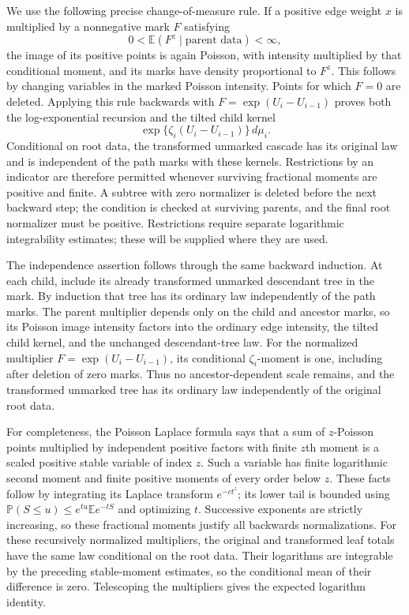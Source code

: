 \documentclass[11pt]{article}
\numberwithin{equation}{section}
\theoremstyle{definition}
\newcommand{\E}{\mathbb E}
\newcommand{\Pbb}{\mathbb P}
\begin{document}
We use the following precise change-of-measure rule. If a positive edge weight $x$ is multiplied by a nonnegative mark $F$ satisfying
\begin{equation}\label{eq:fracmoment}
0<\E(F^z\mid\text{parent data})<\infty,
\end{equation}
the image of its positive points is again Poisson, with intensity multiplied by that conditional moment, and its marks have density proportional to $F^z$. This follows by changing variables in the marked Poisson intensity. Points for which $F=0$ are deleted. Applying this rule backwards with $F=\exp(U_i-U_{i-1})$ proves both the log-exponential recursion and the tilted child kernel
\begin{equation}\label{eq:kernel}
\exp\{\zeta_i(U_i-U_{i-1})\}\,d\mu_i.
\end{equation}
Conditional on root data, the transformed unmarked cascade has its original law and is independent of the path marks with these kernels. Restrictions by an indicator are therefore permitted whenever surviving fractional moments are positive and finite. A subtree with zero normalizer is deleted before the next backward step; the condition is checked at surviving parents, and the final root normalizer must be positive. Restrictions require separate logarithmic integrability estimates; these will be supplied where they are used.

The independence assertion follows through the same backward induction.
At each child, include its already transformed unmarked descendant tree in
the mark. By induction that tree has its ordinary law independently of the
path marks. The parent multiplier depends only on the child and ancestor
marks, so its Poisson image intensity factors into the ordinary edge
intensity, the tilted child kernel, and the unchanged descendant-tree law.
For the normalized multiplier $F=\exp(U_i-U_{i-1})$, its conditional
$\zeta_i$-moment is one, including after deletion of zero marks. Thus no
ancestor-dependent scale remains, and the transformed unmarked tree has
its ordinary law independently of the original root data.

For completeness, the Poisson Laplace formula says that a sum of $z$-Poisson points multiplied by independent positive factors with finite $z$th moment is a scaled positive stable variable of index $z$. Such a variable has finite logarithmic second moment and finite positive moments of every order below $z$. These facts follow by integrating its Laplace transform $e^{-ct^z}$; its lower tail is bounded using $\Pbb(S\le u)\le e^{tu}\E e^{-tS}$ and optimizing $t$. Successive exponents are strictly increasing, so these fractional moments justify all backwards normalizations. For these recursively normalized multipliers, the original and transformed leaf totals have the same law conditional on the root data. Their logarithms are integrable by the preceding stable-moment estimates, so the conditional mean of their difference is zero. Telescoping the multipliers gives the expected logarithm identity.
\end{document}
